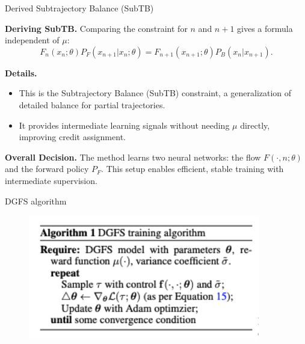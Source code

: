 \documentclass[aspectratio=169,xcolor=dvipsnames]{beamer}
\begin{document}
\begin{frame}[t]{Derived Subtrajectory Balance (SubTB)}
\footnotesize

\textbf{Deriving SubTB.} Comparing the constraint for $n$ and $n+1$ gives a formula independent of $\mu$:
\[
F_n(x_n; \theta) P_F(x_{n+1} | x_n; \theta) = F_{n+1}(x_{n+1}; \theta) P_B(x_n | x_{n+1}).
\]

\textbf{Details.}
\begin{itemize}\itemsep2pt
  \item This is the Subtrajectory Balance (SubTB) constraint, a generalization of detailed balance for partial trajectories.
  \item It provides intermediate learning signals without needing $\mu$ directly, improving credit assignment.
\end{itemize}

\textbf{Overall Decision.} The method learns two neural networks: the flow $F(\cdot, n; \theta)$ and the forward policy $P_F$. This setup enables efficient, stable training with intermediate supervision.

\end{frame}

\begin{frame}[t]{DGFS algorithm}

    \begin{figure}
        \centering
        \includegraphics[width=0.9\textwidth]{figures/algo.png}
    \end{figure}

\end{frame}


\end{document}
